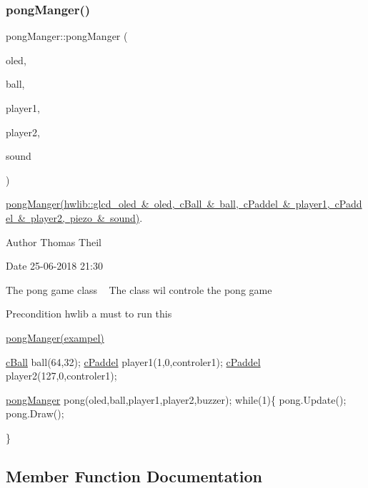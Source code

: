 \subsubsection{\texorpdfstring{pong\+Manger()}{pongManger()}}
{\footnotesize\ttfamily pong\+Manger\+::pong\+Manger (\begin{DoxyParamCaption}\item[{hwlib\+::glcd\+\_\+oled \&}]{oled,  }\item[{\mbox{\hyperlink{classc_ball}{c\+Ball}} \&}]{ball,  }\item[{\mbox{\hyperlink{classc_paddel}{c\+Paddel}} \&}]{player1,  }\item[{\mbox{\hyperlink{classc_paddel}{c\+Paddel}} \&}]{player2,  }\item[{\mbox{\hyperlink{classpiezo}{piezo}} \&}]{sound }\end{DoxyParamCaption})}



\mbox{\hyperlink{classpong_manger_a757b4d3c1ace0490604e4f93da6b5a04}{pong\+Manger(hwlib\+::glcd\+\_\+oled  \& oled, c\+Ball \& ball, c\+Paddel \& player1, c\+Paddel \& player2, piezo \& sound)}}. 

\begin{DoxyAuthor}{Author}
Thomas Theil 
\end{DoxyAuthor}
\begin{DoxyDate}{Date}
25-\/06-\/2018 21\+:30
\end{DoxyDate}
The pong game class ~\newline
The class wil controle the pong game

\begin{DoxyPrecond}{Precondition}
hwlib a must to run this 
\end{DoxyPrecond}
\mbox{\hyperlink{classpong_manger}{pong\+Manger(exampel)}} 
\begin{DoxyCode}
\mbox{\hyperlink{classc_ball}{cBall}} ball(64,32);
\mbox{\hyperlink{classc_paddel}{cPaddel}} player1(1,0,controler1);
\mbox{\hyperlink{classc_paddel}{cPaddel}} player2(127,0,controler1);

\mbox{\hyperlink{classpong_manger}{pongManger}} pong(oled,ball,player1,player2,buzzer);
\textcolor{keywordflow}{while}(1)\{
    pong.Update();
    pong.Draw();

\}
\end{DoxyCode}
 

\subsection{Member Function Documentation}
\mbox{\label{classpong_manger_a177da6a9f5120dc153b8f33d8e6bebc3}} 
